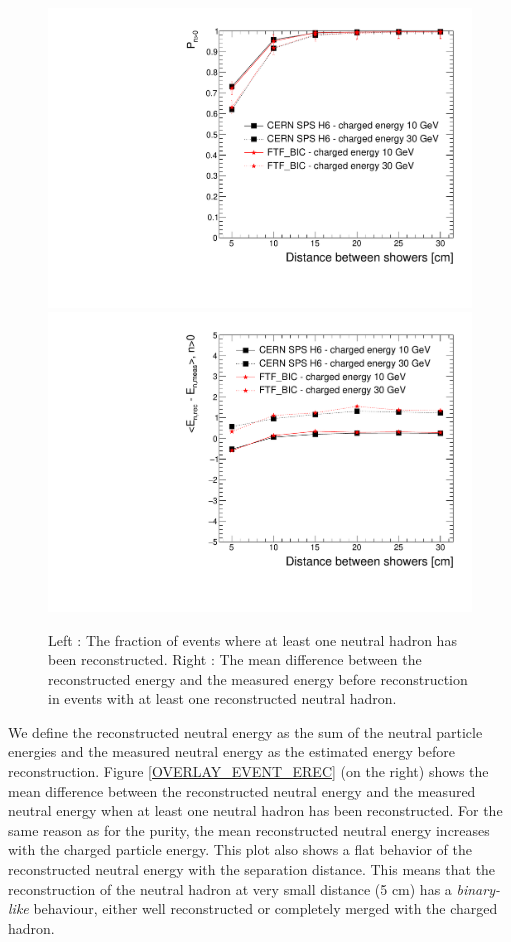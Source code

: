 \documentclass[cits]{JINST}
\begin{document}
\begin{figure}[!h]
  \begin{center}
    \includegraphics[width=0.47\linewidth]{plots/OverlayEvent/OverlayEvent_ProbaNeutral.pdf}
    \includegraphics[width=0.47\linewidth]{plots/OverlayEvent/OverlayEvent_EnergyDifference.pdf}
  \end{center}
  \caption{\label{OVERLAY_EVENT_EREC} \label{OVERLAY_EVENT_NEUTRAL_PERCENTAGE} Left : The fraction of events where at least one neutral hadron has been reconstructed. Right : The mean difference between the reconstructed energy and the measured energy before reconstruction in events with at least one reconstructed neutral hadron.}
\end{figure}

We define the reconstructed neutral energy as the sum of the neutral particle energies and the measured neutral energy as the estimated energy before reconstruction. Figure \ref{OVERLAY_EVENT_EREC} (on the right) shows the mean difference between the reconstructed neutral energy and the measured neutral energy when at least one neutral hadron has been reconstructed. For the same reason as for the purity, the mean reconstructed neutral energy increases with the charged particle energy. This plot also shows a flat behavior of the reconstructed neutral energy with the separation distance. This means that the reconstruction of the neutral hadron at very small distance (5 cm) has a \textit{binary-like} behaviour, either well reconstructed or completely merged with the charged hadron.


\clearpage
\newpage
\end{document}
